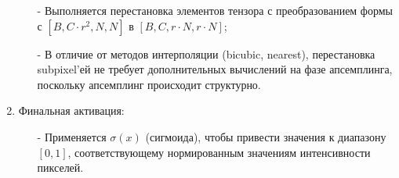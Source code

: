 \documentclass[a4paper,14pt]{extreport}
\begin{document}
\begin{enumerate}
                \begin{itemize}
                    \item[-] Выполняется перестановка элементов тензора с преобразованием формы с $[B, C \cdot r^2, N, N]$ в $[B, C, r \cdot N, r \cdot N]$;
                    \item[-] В отличие от методов интерполяции (bicubic, nearest), перестановка subpixel'ей не требует дополнительных вычислений на фазе апсемплинга, поскольку апсемплинг происходит структурно.
                \end{itemize}
            \item Финальная активация:
                \begin{itemize}
                    \item[-] Применяется $\sigma(x)$ (сигмоида), чтобы привести значения к диапазону $[0, 1]$, соответствующему нормированным значениям интенсивности пикселей.
                \end{itemize}
        \end{enumerate}
\end{document}
